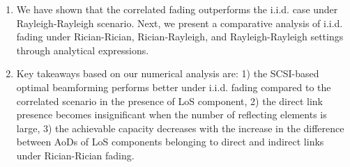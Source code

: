 \documentclass[journal,draftclsnofoot,onecolumn,12pt]{IEEEtran}
\begin{document}
\begin{enumerate}
\item We have shown that the correlated fading outperforms the {\rm i.i.d.} case under Rayleigh-Rayleigh scenario. Next, we present a comparative analysis of {\rm i.i.d.} fading under Rician-Rician, Rician-Rayleigh, and Rayleigh-Rayleigh settings through analytical expressions. 
\item Key takeaways based on our numerical analysis are: 1) the SCSI-based optimal beamforming  performs better under {\rm i.i.d.} fading compared to the correlated scenario in the presence of  LoS component, 2) the direct link presence becomes insignificant when the number of reflecting elements is large, 3) the achievable capacity decreases with the increase in the difference between AoDs of LoS components belonging to direct and indirect links under Rician-Rician fading. 

\end{enumerate}
\end{document}

